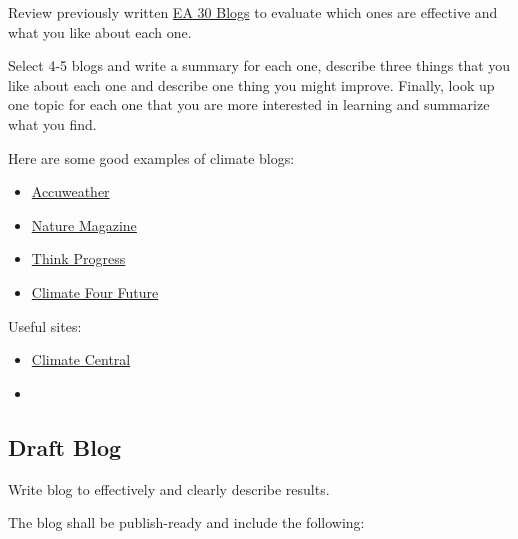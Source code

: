\documentclass{article}\usepackage[]{graphicx}\usepackage[]{color}
\begin{document}
Review previously written \href{https://marclos.github.io/Climate_Change_Narratives/}{EA 30 Blogs} to evaluate which ones are effective and what you like about each one. 

Select 4-5 blogs and write a summary for each one, describe three things that you like about each one and describe one thing you might improve. Finally, look up one topic for each one that you are more interested in learning and summarize what you find.

Here are some good examples of climate blogs:

\begin{itemize}
  \item \href{http://www.accuweather.com/en/weather-blogs/climatechange}{Accuweather}
  \item \href{http://blogs.nature.com/climatefeedback/}{Nature Magazine}
  \item \href{https://thinkprogress.org/tagged/climate}{Think Progress}
  \item \href{http://climateofourfuture.org/}{Climate Four Future}
\end{itemize}

Useful sites: 

\begin{itemize}
  \item \href{http://www.climatecentral.org/news/the-heat-is-on}{Climate Central}
  \item 
\end{itemize}


\subsection{Draft Blog}

Write blog to effectively and clearly describe results.

The blog shall be publish-ready and include the following: 
\end{document}
